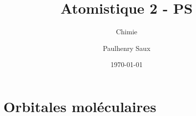 \documentclass[french]{yLectureNote}
\title{Atomistique 2 - PS}
\subtitle{Chimie}
\author{Paulhenry Saux}
\date{\today}
\newcommand{\HH}{\hat{H}}
\newcommand{\hb}{\hbar}
\newcommand{\lap}{\nabla^2}
\begin{document}
\setcounter{chapter}{1}
\chapter{Orbitales moléculaires}
\end{document}
